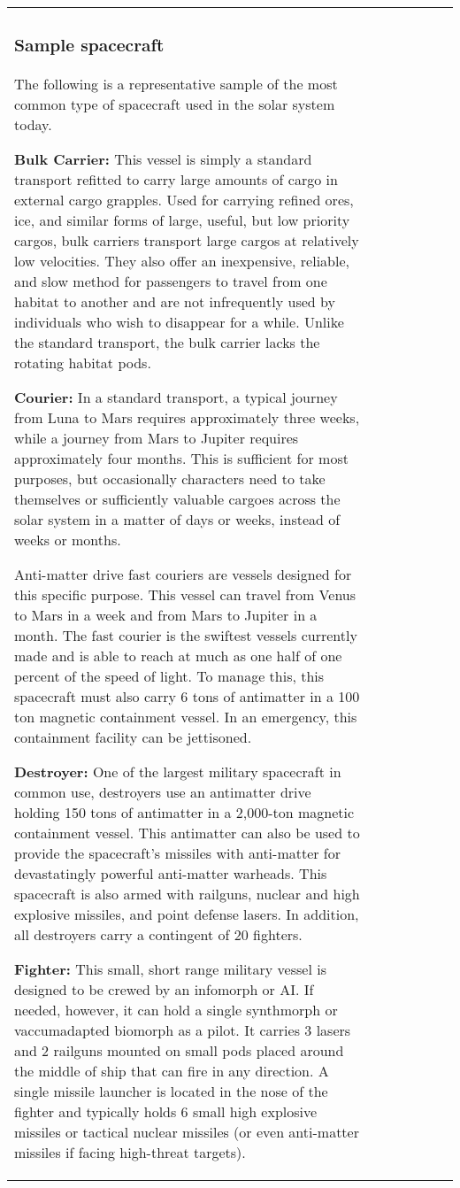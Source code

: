 \begin{tabular}{|l|l|l|l|l|l|l|}
\subsubsection{Sample spacecraft} 

The following is a representative sample of the most common type of spacecraft used in the solar system today. 

\textbf{Bulk Carrier:} This vessel is simply a standard transport refitted to carry large amounts of cargo in external cargo grapples. Used for carrying refined ores, ice, and similar forms of large, useful, but low priority cargos, bulk carriers transport large cargos at relatively low velocities. They also offer an inexpensive, reliable, and slow method for passengers to travel from one habitat to another and are not infrequently used by individuals who wish to disappear for a while. Unlike the standard transport, the bulk carrier lacks the rotating habitat pods. 

\textbf{Courier:} In a standard transport, a typical journey from Luna to Mars requires approximately three weeks, while a journey from Mars to Jupiter requires approximately four months. This is sufficient for most purposes, but occasionally characters need to take themselves or sufficiently valuable cargoes across the solar system in a matter of days or weeks, instead of weeks or months. 

Anti-matter drive fast couriers are vessels designed for this specific purpose. This vessel can travel from Venus to Mars in a week and from Mars to Jupiter in a month. The fast courier is the swiftest vessels currently made and is able to reach at much as one half of one percent of the speed of light. To manage this, this spacecraft must also carry 6 tons of antimatter in a 100 ton magnetic containment vessel. In an emergency, this containment facility can be jettisoned. 

\textbf{Destroyer:} One of the largest military spacecraft in common use, destroyers use an antimatter drive holding 150 tons of antimatter in a 2,000-ton magnetic containment vessel. This antimatter can also be used to provide the spacecraft’s missiles with anti-matter for devastatingly powerful anti-matter warheads. This spacecraft is also armed with railguns, nuclear and high explosive missiles, and point defense lasers. In addition, all destroyers carry a contingent of 20 fighters. 

\textbf{Fighter:} This small, short range military vessel is designed to be crewed by an infomorph or AI. If needed, however, it can hold a single synthmorph or vaccumadapted biomorph as a pilot. It carries 3 lasers and 2 railguns mounted on small pods placed around the middle of ship that can fire in any direction. A single missile launcher is located in the nose of the fighter and typically holds 6 small high explosive missiles or tactical nuclear missiles (or even anti-matter missiles if facing high-threat targets). 


\end{tabular}
